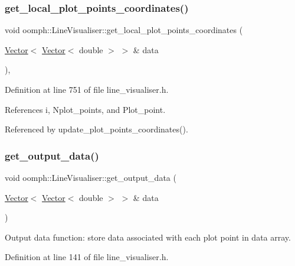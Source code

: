\subsubsection{\texorpdfstring{get\+\_\+local\+\_\+plot\+\_\+points\+\_\+coordinates()}{get\_local\_plot\_points\_coordinates()}}
{\footnotesize\ttfamily void oomph\+::\+Line\+Visualiser\+::get\+\_\+local\+\_\+plot\+\_\+points\+\_\+coordinates (\begin{DoxyParamCaption}\item[{\hyperlink{classoomph_1_1Vector}{Vector}$<$ \hyperlink{classoomph_1_1Vector}{Vector}$<$ double $>$ $>$ \&}]{data }\end{DoxyParamCaption})\hspace{0.3cm}{\ttfamily [inline]}, {\ttfamily [private]}}



Definition at line 751 of file line\+\_\+visualiser.\+h.



References i, Nplot\+\_\+points, and Plot\+\_\+point.



Referenced by update\+\_\+plot\+\_\+points\+\_\+coordinates().

\mbox{\label{classoomph_1_1LineVisualiser_af2fadf8f1270a15a912cadfea152891e}} 
\subsubsection{\texorpdfstring{get\+\_\+output\+\_\+data()}{get\_output\_data()}}
{\footnotesize\ttfamily void oomph\+::\+Line\+Visualiser\+::get\+\_\+output\+\_\+data (\begin{DoxyParamCaption}\item[{\hyperlink{classoomph_1_1Vector}{Vector}$<$ \hyperlink{classoomph_1_1Vector}{Vector}$<$ double $>$ $>$ \&}]{data }\end{DoxyParamCaption})\hspace{0.3cm}{\ttfamily [inline]}}



Output data function\+: store data associated with each plot point in data array. 



Definition at line 141 of file line\+\_\+visualiser.\+h.



